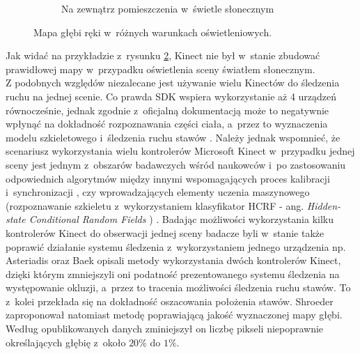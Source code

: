 \begin{figure}
\begin{subfigure}[b]{0.32\textwidth}
		\caption{Na zewnątrz pomieszczenia w~świetle słonecznym}
		\label{fig:characteristics:kinect:depthMapC}
	\end{subfigure}
	\caption{Mapa głębi ręki w~różnych warunkach oświetleniowych\cite{Suarez2012}.}
	\label{fig:characteristics:kinect:depthMap}
\end{figure}
		
Jak widać na przykładzie z~rysunku \ref{fig:characteristics:kinect:depthMap}, Kinect nie był w~stanie zbudować prawidłowej mapy w~przypadku oświetlenia sceny światłem słonecznym. \\
Z podobnych względów niezalecane jest używanie wielu Kinectów do śledzenia ruchu na jednej scenie. Co prawda SDK wspiera wykorzystanie aż 4 urządzeń równocześnie, jednak zgodnie z~oficjalną dokumentacją może to negatywnie wpłynąć na dokładność rozpoznawania części ciała, a~przez to wyznaczenia modelu szkieletowego i~śledzenia ruchu stawów \cite{msdn:multipleKinectsSDK2016}. Należy jednak wspomnieć, że scenariusz wykorzystania wielu kontrolerów Microsoft Kinect w~przypadku jednej sceny jest jednym z~obszarów badawczych wśród naukowców i~po zastosowaniu odpowiednich algorytmów między innymi  wspomagających proces kalibracji i~synchronizacji \cite{Kohno2013}, czy wprowadzających elementy uczenia maszynowego (rozpoznawanie szkieletu z~wykorzystaniem klasyfikator HCRF - ang. \emph{Hidden-state Conditional Random Fields }) \cite{Kitsikidis2011}. Badając możliwości wykorzystania kilku kontrolerów Kinect do obserwacji jednej sceny badacze byli w~stanie także poprawić działanie systemu śledzenia z~wykorzystaniem jednego urządzenia np. Asteriadis \cite{Asteriadis2013} oraz Baek \cite{Baek2014} opisali metody wykorzystania dwóch kontrolerów Kinect, dzięki którym zmniejszyli oni podatność prezentowanego systemu śledzenia na występowanie okluzji, a~przez to tracenia możliwości śledzenia ruchu stawów. To z~kolei przekłada się na dokładność oszacowania położenia stawów. Shroeder \cite{Schroder2011} zaproponował natomiast metodę poprawiającą jakość wyznaczonej mapy głębi. Według opublikowanych danych zminiejszył on liczbę pikseli niepoprawnie określających głębię z~około $20\%$ do $1\%$.
		
